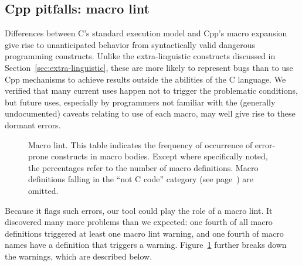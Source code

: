 \documentclass[10pt]{article}
\newcommand{\captionsmall}[1]{\caption[]{\small #1}}
\begin{document}
\begin{description}
\end{description}



\subsection{Cpp pitfalls:  macro lint}
\label{sec:lint}

Differences between C's standard execution model and Cpp's macro expansion
give rise to unanticipated behavior from syntactically valid dangerous
programming constructs.  Unlike the extra-linguistic constructs discussed
in Section~\ref{sec:extra-linguistic}, these are more likely to represent bugs
than to use Cpp mechanisms to achieve results outside the abilities of the
C language.  We verified that many current uses happen not to trigger the
problematic conditions, but future uses, especially by programmers not
familiar with the (generally undocumented) caveats relating to use of each
macro, may well give rise to these dormant errors.

\begin{figure}
  {\small\centerline{}}
  
  \captionsmall{Macro lint.  This table indicates the frequency of occurrence of
    error-prone constructs in macro bodies.  Except where specifically
    noted, the percentages refer to the number of macro definitions.  Macro
    definitions falling in the ``not C code'' category (see
    page~\pageref{page:not-c-code}) are omitted.}
  \label{fig:macro-lint}
\end{figure}

Because it flags such errors, our tool could play the role of a macro lint.
It discovered many more problems than we expected: one fourth of all macro
definitions triggered at least one macro lint warning, and one fourth of
macro names have a definition that triggers a warning.
Figure~\ref{fig:macro-lint} further breaks down the warnings, which are
described below.
\end{document}
